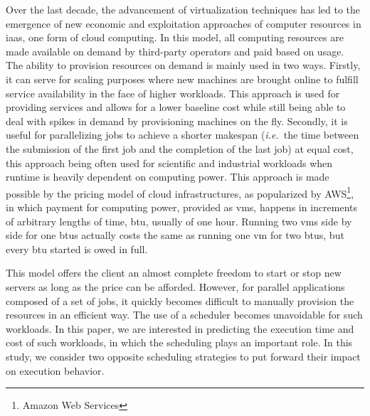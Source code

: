 \documentclass[10pt,conference,compsocconf]{IEEEtran}
\begin{document}
Over the  last decade, the advancement  of virtualization techniques has  led to
the emergence of new economic  and exploitation approaches of computer resources
in  \ac{iaas},  one form  of cloud  computing. In  this model,  all
computing resources  are made available  on demand by third-party  operators and
paid based  on usage.  The  ability to provision  resources on demand  is mainly
used in two ways.  Firstly, it can serve for scaling purposes where new machines
are  brought online  to  fulfill  service availability  in  the  face of higher 
workloads.  This approach  is used  for  providing services  and allows  for a  lower
baseline  cost  while  still  being  able  to deal  with  spikes  in  demand  by
provisioning machines on the fly. Secondly, it is useful for parallelizing jobs
to achieve a shorter makespan (\textit{i.e.}\ the time between the submission of the first
job and the completion of the  last job)  at equal  cost, this  approach being  often used  for
scientific  and  industrial  workloads  when runtime  is  heavily  dependent  on
computing power.  This  approach is made possible by the  pricing model of cloud
infrastructures, as  popularized by AWS\footnote{Amazon Web  Services}, in which
payment  for computing  power, provided  as \acp{vm},  happens in  increments of
arbitrary lengths  of time, \ac{btu}, usually  of one hour. Running  two \acp{vm}
side by side for one \acp{btu} actually costs the same as running one \ac{vm} for two
\acp{btu}, but every \ac{btu} started is owed in full.

This model  offers the client  an almost complete freedom  to start or  stop new
servers as long as the price can be afforded. However, for parallel applications composed
of a set of jobs, it  quickly  becomes  difficult  to manually  provision  the
resources in an  efficient way.  The use of a  scheduler becomes unavoidable for
such workloads.   In this paper, we  are interested in predicting  the execution
time  and cost  of such  workloads, in  which the  scheduling plays  an
important role.  In  this study, we consider two  opposite scheduling strategies
to put forward their impact on execution behavior.
\end{document}
